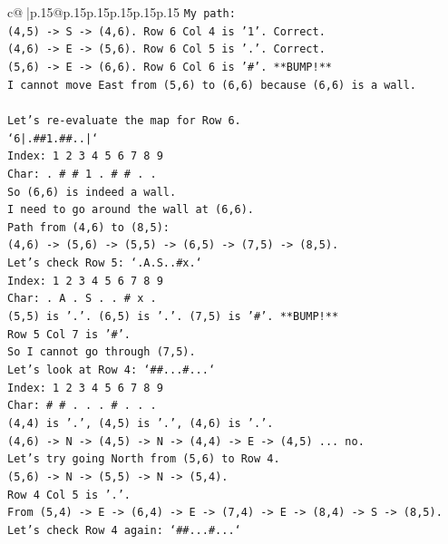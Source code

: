 \documentclass{article}
\begin{document}
{\begin{supertabular}{c@{$\;$}|p{.15\linewidth}@{}p{.15\linewidth}p{.15\linewidth}p{.15\linewidth}p{.15\linewidth}p{.15\linewidth}}
{{{\texttt{My path:} \\
\texttt{(4,5) {-}> S {-}> (4,6). Row 6 Col 4 is '1'. Correct.} \\
\texttt{(4,6) {-}> E {-}> (5,6). Row 6 Col 5 is '.'. Correct.} \\
\texttt{(5,6) {-}> E {-}> (6,6). Row 6 Col 6 is '\#'. **BUMP!**} \\
\texttt{I cannot move East from (5,6) to (6,6) because (6,6) is a wall.} \\
\\ 
\texttt{Let's re{-}evaluate the map for Row 6.} \\
\texttt{`6|.\#\#1.\#\#..|`} \\
\texttt{Index: 1 2 3 4 5 6 7 8 9} \\
\texttt{Char:  . \# \# 1 . \# \# . .} \\
\texttt{So (6,6) is indeed a wall.} \\
\texttt{I need to go around the wall at (6,6).} \\
\texttt{Path from (4,6) to (8,5):} \\
\texttt{(4,6) {-}> (5,6) {-}> (5,5) {-}> (6,5) {-}> (7,5) {-}> (8,5).} \\
\texttt{Let's check Row 5: `.A.S..\#x.`} \\
\texttt{Index: 1 2 3 4 5 6 7 8 9} \\
\texttt{Char:  . A . S . . \# x .} \\
\texttt{(5,5) is '.'. (6,5) is '.'. (7,5) is '\#'. **BUMP!**} \\
\texttt{Row 5 Col 7 is '\#'.} \\
\texttt{So I cannot go through (7,5).} \\
\texttt{Let's look at Row 4: `\#\#...\#...`} \\
\texttt{Index: 1 2 3 4 5 6 7 8 9} \\
\texttt{Char:  \# \# . . . \# . . .} \\
\texttt{(4,4) is '.', (4,5) is '.', (4,6) is '.'.} \\
\texttt{(4,6) {-}> N {-}> (4,5) {-}> N {-}> (4,4) {-}> E {-}> (4,5) ... no.} \\
\texttt{Let's try going North from (5,6) to Row 4.} \\
\texttt{(5,6) {-}> N {-}> (5,5) {-}> N {-}> (5,4).} \\
\texttt{Row 4 Col 5 is '.'.} \\
\texttt{From (5,4) {-}> E {-}> (6,4) {-}> E {-}> (7,4) {-}> E {-}> (8,4) {-}> S {-}> (8,5).} \\
\texttt{Let's check Row 4 again: `\#\#...\#...`} \\
}}}
\end{supertabular}}
\end{document}
